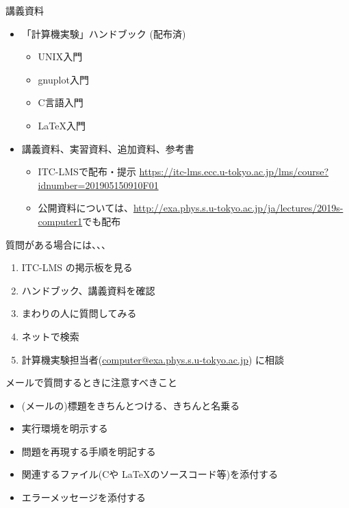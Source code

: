\begin{frame}[t]{講義資料}
  \begin{itemize}
    \setlength{\itemsep}{1em}
  \item 「計算機実験」ハンドブック (配布済)
    \begin{itemize}
    \item UNIX入門
    \item gnuplot入門
    \item C言語入門
    \item \LaTeX 入門
    \end{itemize}
  \item 講義資料、実習資料、追加資料、参考書
    \begin{itemize}
    \item ITC-LMSで配布・提示 \url{https://itc-lms.ecc.u-tokyo.ac.jp/lms/course?idnumber=201905150910F01}
    \item 公開資料については、\url{http://exa.phys.s.u-tokyo.ac.jp/ja/lectures/2019s-computer1}でも配布
    \end{itemize}
  \end{itemize}
\end{frame}

\begin{frame}[t]{質問がある場合には、、、}
  \begin{enumerate}
  \item ITC-LMS の掲示板を見る
  \item ハンドブック、講義資料を確認
  \item まわりの人に質問してみる
  \item ネットで検索
  \item 計算機実験担当者(\href{mailto:computer@exa.phys.s.u-tokyo.ac.jp}{computer@exa.phys.s.u-tokyo.ac.jp}) に相談
  \end{enumerate}
  メールで質問するときに注意すべきこと
  \begin{itemize}
  \item (メールの)標題をきちんとつける、きちんと名乗る
  \item 実行環境を明示する
  \item 問題を再現する手順を明記する
  \item 関連するファイル(Cや \LaTeX のソースコード等)を添付する
  \item エラーメッセージを添付する
  \end{itemize}
\end{frame}

